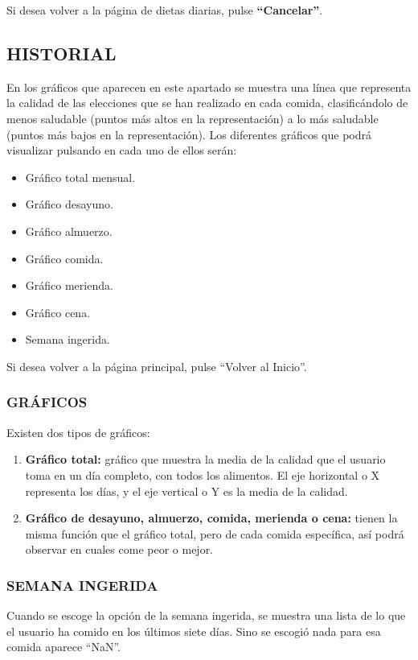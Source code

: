 Si desea volver a la página de dietas diarias, pulse \textbf{“Cancelar”}.
\pagebreak

\subsection{HISTORIAL}

En los gráficos que aparecen en este apartado se muestra una línea que representa la calidad de las elecciones que se han realizado en cada comida, clasificándolo de menos saludable (puntos más altos en la representación) a lo más saludable (puntos más bajos en la representación).
Los diferentes gráficos que podrá visualizar pulsando en cada uno de ellos serán:
\begin{itemize}
\item	Gráfico total mensual.
\item	Gráfico desayuno.
\item	Gráfico almuerzo.
\item	Gráfico comida.
\item	Gráfico merienda.
\item	Gráfico cena.
\item	Semana ingerida.
\end{itemize}	

Si desea volver a la página principal, pulse “Volver al Inicio”.
\subsubsection{GRÁFICOS}
Existen dos tipos de gráficos:
\begin{enumerate}
\item \textbf{Gráfico total:} gráfico que muestra la media de la calidad que el usuario toma en un día completo, con todos los alimentos. El eje horizontal o X representa los días, y el eje vertical o Y es la media de la calidad.
\item \textbf{Gráfico de desayuno, almuerzo, comida, merienda o cena:} tienen la misma función que el gráfico total, pero de cada comida específica, así podrá observar en cuales come peor o mejor.
\end{enumerate}
\clearpage

\subsubsection{SEMANA INGERIDA}
Cuando se escoge la opción de la semana ingerida, se muestra una lista de lo que el usuario ha comido en los últimos siete días. Sino se escogió nada para esa comida aparece “NaN”.
\newpage


